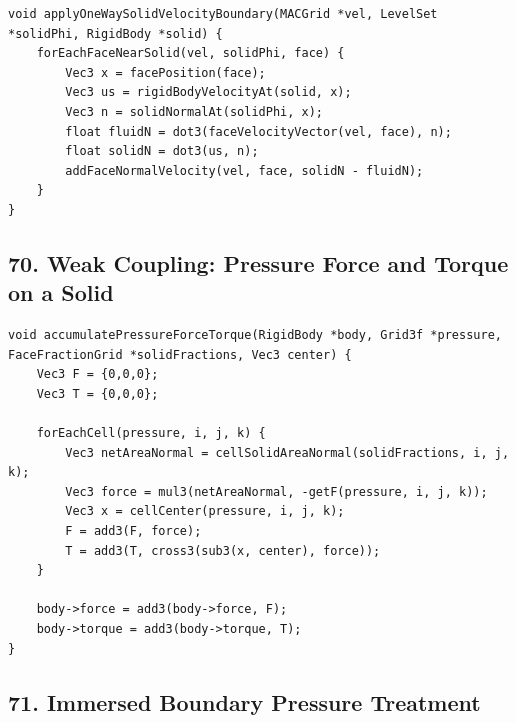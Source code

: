 \documentclass[10pt,letterpaper]{article}
\begin{document}
\begin{verbatim}
void applyOneWaySolidVelocityBoundary(MACGrid *vel, LevelSet *solidPhi, RigidBody *solid) {
    forEachFaceNearSolid(vel, solidPhi, face) {
        Vec3 x = facePosition(face);
        Vec3 us = rigidBodyVelocityAt(solid, x);
        Vec3 n = solidNormalAt(solidPhi, x);
        float fluidN = dot3(faceVelocityVector(vel, face), n);
        float solidN = dot3(us, n);
        addFaceNormalVelocity(vel, face, solidN - fluidN);
    }
}
\end{verbatim}

\subsection*{70. Weak Coupling: Pressure Force and Torque on a Solid}

\begin{verbatim}
void accumulatePressureForceTorque(RigidBody *body, Grid3f *pressure, FaceFractionGrid *solidFractions, Vec3 center) {
    Vec3 F = {0,0,0};
    Vec3 T = {0,0,0};

    forEachCell(pressure, i, j, k) {
        Vec3 netAreaNormal = cellSolidAreaNormal(solidFractions, i, j, k);
        Vec3 force = mul3(netAreaNormal, -getF(pressure, i, j, k));
        Vec3 x = cellCenter(pressure, i, j, k);
        F = add3(F, force);
        T = add3(T, cross3(sub3(x, center), force));
    }

    body->force = add3(body->force, F);
    body->torque = add3(body->torque, T);
}
\end{verbatim}

\subsection*{71. Immersed Boundary Pressure Treatment}
\end{document}
